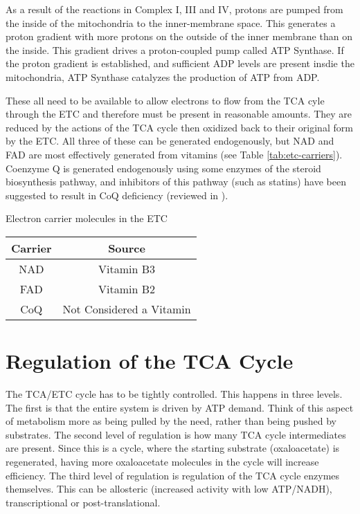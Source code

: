 \documentclass{tufte-handout}
\begin{document}
As a result of the reactions in Complex I, III and IV, protons are pumped from the inside of the mitochondria to the inner-membrane space.  This generates a proton gradient with more protons on the outside of the inner membrane than on the inside.  This gradient drives a proton-coupled pump called ATP Synthase.  If the proton gradient is established, and sufficient ADP levels are present insdie the mitochondria, ATP Synthase catalyzes the production of ATP from ADP.

 These all need to be available to allow electrons to flow from the TCA cyle through the ETC and therefore must be present in reasonable amounts.  They are reduced by the actions of the TCA cycle then oxidized back to their original form by the ETC.  All three of these can be generated endogenously, but NAD and FAD are most effectively generated from vitamins (see Table \ref{tab:etc-carriers}).  Coenzyme Q is generated endogenously using some enzymes of the steroid biosynthesis pathway, and inhibitors of this pathway (such as statins) have been suggested to result in CoQ deficiency (reviewed in \citet{Quinzii2007}).

\begin{margintable}
\centering
\caption{Electron carrier molecules in the ETC}
\label{tab:etc-carriers}
\begin{tabular}{cc}
\hline
\textbf {Carrier} & \textbf{Source}\\
\hline
NAD & Vitamin B3 \\
FAD & Vitamin B2  \\
CoQ & Not Considered a Vitamin \\
\hline
\end{tabular}
\end{margintable}


\section{Regulation of the TCA Cycle}

The TCA/ETC cycle has to be tightly controlled.  This happens in three levels.  The first is that the entire system is driven by ATP demand.  Think of this aspect of metabolism more as being pulled by the need, rather than being pushed by substrates.  The second level of regulation is how many TCA cycle intermediates are present.  Since this is a cycle, where the starting substrate (oxaloacetate) is regenerated, having more oxaloacetate molecules in the cycle will increase efficiency.  The third level of regulation is regulation of the TCA cycle enzymes themselves.  This can be allosteric (increased activity with low ATP/NADH), transcriptional or post-translational.
\end{document}
